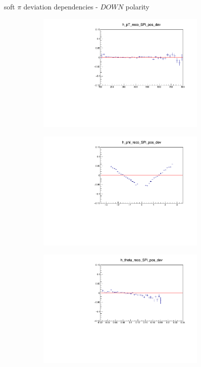 \documentclass[11pt]{beamer}
\begin{document}
\begin{frame}{soft $\pi$ deviation dependencies - $DOWN$ polarity}
\begin{figure}
\begin{subfigure}{0.45\textwidth}
\includegraphics[width=0.9\textwidth]{fourth/down_pdf/deviation/h_pt_reco_SPi_pos_dev.pdf}
\end{subfigure}
\begin{subfigure}{0.45\textwidth}
\includegraphics[width=0.9\textwidth]{fourth/down_pdf/deviation/h_phi_reco_SPi_pos_dev.pdf}
\end{subfigure}
\begin{subfigure}{0.45\textwidth}
\includegraphics[width=0.9\textwidth]{fourth/down_pdf/deviation/h_theta_reco_SPi_pos_dev.pdf}

\end{subfigure}
\end{figure}
\end{frame}
\end{document}
